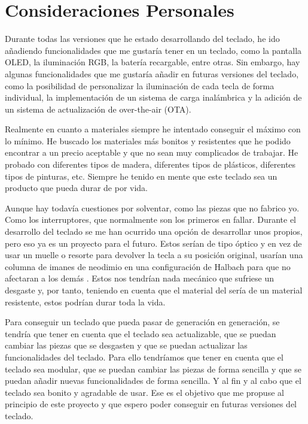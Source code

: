 \section{Consideraciones Personales}
Durante todas las versiones que he estado desarrollando del teclado, he ido añadiendo funcionalidades que me gustaría tener en un teclado, como la pantalla \gls{OLED}, la iluminación RGB, la batería recargable, entre otras. Sin embargo, hay algunas funcionalidades que me gustaría añadir en futuras versiones del teclado, como la posibilidad de personalizar la iluminación de cada tecla de forma individual, la implementación de un sistema de carga inalámbrica y la adición de un sistema de actualización de  over-the-air (OTA).

Realmente en cuanto a materiales siempre he intentado conseguir el máximo con lo mínimo. He buscado los materiales más bonitos y resistentes que he podido encontrar a un precio aceptable y que no sean muy complicados de trabajar. He probado con diferentes tipos de madera, diferentes tipos de plásticos, diferentes tipos de pinturas, etc. Siempre he tenido en mente que este teclado sea un producto que pueda durar de por vida.

Aunque hay todavía cuestiones por solventar, como las piezas que no fabrico yo. Como los interruptores, que normalmente son los primeros en fallar. Durante el desarrollo del teclado se me han ocurrido una opción de desarrollar unos  propios, pero eso ya es un proyecto para el futuro. Estos  serían de tipo óptico y en vez de usar un muelle o resorte para devolver la tecla a su posición original, usarían una columna de imanes de neodimio en una configuración de Halbach para que no afectaran a los demás . Estos nos tendrían nada mecánico que sufriese un desgaste y, por tanto, teniendo en cuenta que el material del  sería de un material resistente, estos  podrían durar toda la vida.

Para conseguir un teclado que pueda pasar de generación en generación, se tendría que tener en cuenta que el teclado sea actualizable, que se puedan cambiar las piezas que se desgasten y que se puedan actualizar las funcionalidades del teclado. Para ello tendríamos que tener en cuenta que el teclado sea modular, que se puedan cambiar las piezas de forma sencilla y que se puedan añadir nuevas funcionalidades de forma sencilla. Y al fin y al cabo que el teclado sea bonito y agradable de usar. Ese es el objetivo que me propuse al principio de este proyecto y que espero poder conseguir en futuras versiones del teclado.